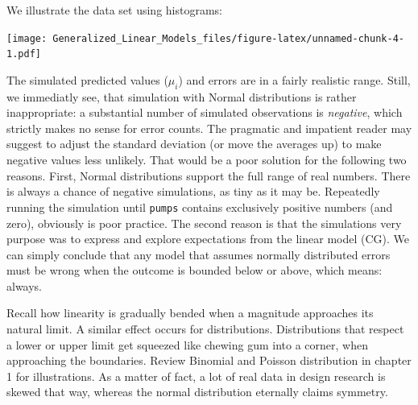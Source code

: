 \documentclass[]{svmono}
\newenvironment{Shaded}{\begin{snugshade}}{\end{snugshade}}
\newcommand{\KeywordTok}[1]{\textcolor[rgb]{0.13,0.29,0.53}{\textbf{#1}}}
\newcommand{\DataTypeTok}[1]{\textcolor[rgb]{0.13,0.29,0.53}{#1}}
\newcommand{\DecValTok}[1]{\textcolor[rgb]{0.00,0.00,0.81}{#1}}
\newcommand{\StringTok}[1]{\textcolor[rgb]{0.31,0.60,0.02}{#1}}
\newcommand{\OperatorTok}[1]{\textcolor[rgb]{0.81,0.36,0.00}{\textbf{#1}}}
\newcommand{\NormalTok}[1]{#1}
\theoremstyle{definition}
\theoremstyle{definition}
\theoremstyle{definition}
\theoremstyle{remark}
\begin{document}
We illustrate the data set using histograms:

\begin{Shaded}
\end{Shaded}

\texttt{[image: Generalized\_Linear\_Models\_files/figure-latex/unnamed-chunk-4-1.pdf]}

The simulated predicted values (\(\mu_i\)) and errors are in a fairly
realistic range. Still, we immediatly see, that simulation with Normal
distributions is rather inappropriate: a substantial number of simulated
observations is \emph{negative}, which strictly makes no sense for error
counts. The pragmatic and impatient reader may suggest to adjust the
standard deviation (or move the averages up) to make negative values
less unlikely. That would be a poor solution for the following two
reasons. First, Normal distributions support the full range of real
numbers. There is always a chance of negative simulations, as tiny as it
may be. Repeatedly running the simulation until \texttt{pumps} contains
exclusively positive numbers (and zero), obviously is poor practice. The
second reason is that the simulations very purpose was to express and
explore expectations from the linear model (CG). We can simply conclude
that any model that assumes normally distributed errors must be wrong
when the outcome is bounded below or above, which means: always.

Recall how linearity is gradually bended when a magnitude approaches its
natural limit. A similar effect occurs for distributions. Distributions
that respect a lower or upper limit get squeezed like chewing gum into a
corner, when approaching the boundaries. Review Binomial and Poisson
distribution in chapter 1 for illustrations. As a matter of fact, a lot
of real data in design research is skewed that way, whereas the normal
distribution eternally claims symmetry.
\end{document}
